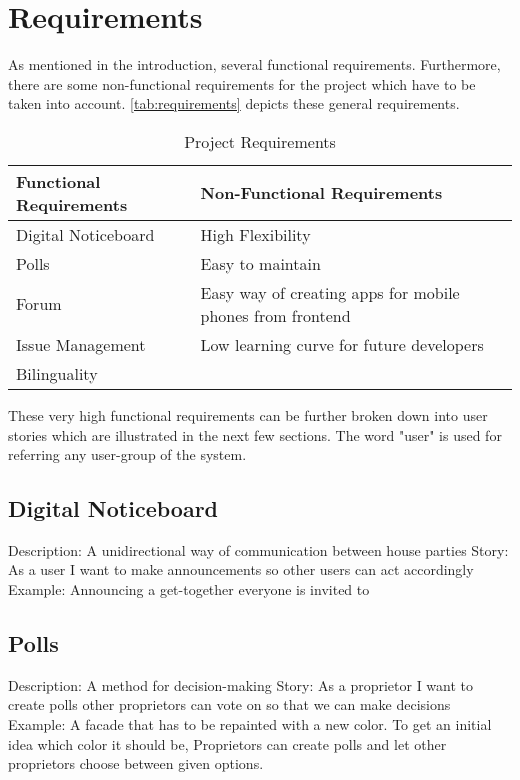 \section{Requirements} \label{sec:requirements}
As mentioned in the introduction, several functional requirements. Furthermore, there are some non-functional requirements for the project which have to be taken into account. \autoref{tab:requirements} depicts these general requirements. \newline

\begin{table}[H]
    \begin{center}
      \begin{tabularx}{\linewidth}{l|l} %
        \textbf{Functional Requirements} & \textbf{Non-Functional Requirements}\\
        \hline
        Digital Noticeboard & High Flexibility \\
        Polls & Easy to maintain\\
        Forum & Easy way of creating apps for mobile phones from frontend\\
        Issue Management & Low learning curve for future developers\\
        Bilinguality & \\
      \end{tabularx}
      \caption{Project Requirements}
      \label{tab:requirements}
    \end{center}
  \end{table}

 
These very high functional requirements can be further broken down into user stories which are illustrated in the next few sections. The word "user" is used for referring any user-group of the system.

\subsection{Digital Noticeboard}
Description: A unidirectional way of communication between house parties \newline
Story: As a user I want to make announcements so other users can act accordingly\newline
Example: Announcing a get-together everyone is invited to 

\subsection{Polls}
Description: A method for decision-making \newline
Story: As a proprietor I want to create polls other proprietors can vote on so that we can make decisions \newline
Example: A facade that has to be repainted with a new color. To get an initial idea which color it should be, Proprietors can create polls and let other proprietors choose between given options.

